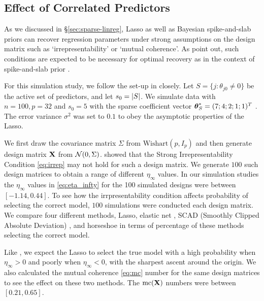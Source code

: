 \documentclass[sts,preprint]{imsart}
\begin{document}
\subsection{Effect of Correlated Predictors}

As we discussed in \S \ref{sec:sparse-linreg}, Lasso as well as Bayesian spike-and-slab priors can recover regression parameters under strong assumptions on the design matrix such as `irrepresentability' or `mutual coherence'. As \citet{van2017adaptive} point out, such conditions are expected to be necessary for optimal recovery as in the context of spike-and-slab prior \citep{castillo2015bayesian}. 

For this simulation study, we follow the set-up in \citet{zhao2006model} closely. Let $S = \{j : \theta_{j0} \ne 0 \}$ be the active set of predictors, and let $s_0 = \lvert S\rvert$. We simulate data with $n = 100, p = 32$ and $s_0 = 5$ with the sparse coefficient vector $\boldsymbol{\theta}_S^* = (7; 4; 2; 1; 1)^T$ . The error variance $\sigma^2$ was set to $0.1$ to obey the asymptotic properties of the Lasso. 


We first draw the covariance matrix $\Sigma$ from $\text{Wishart}(p, I_p)$ and then generate design matrix ${\bf X}$ from ${\cal N}(0, \Sigma)$. \citet{zhao2006model} showed that the Strong Irrepresentability Condition \eqref{eq:irrep} may not hold for such a design matrix. We generate $100$ such design matrices to obtain a range of different $\eta_{\infty}$ values. In our simulation studies the $\eta_{\infty}$ values in \eqref{eq:eta_infty} for the 100 simulated designs were between $[-1.14,0.44]$. To see how the irrpresentability condition affects probability of selecting the correct model, $100$ simulations were conducted each design matrix. We compare four different methods, Lasso, elastic net \citep{zou2006adaptive}, SCAD (Smoothly Clipped Absolute Deviation) \citep{fan2001variable}, and horseshoe in terms of percentage of these methods selecting the correct model. 

Like \cite{zhao2006model}, we expect the Lasso to select the true model with a high probability when $\eta_{\infty} >0$ and poorly when $\eta_{\infty} < 0$, with the sharpest ascent around the origin. We also calculated the mutual coherence \eqref{eq:mc} number for the same design matrices to see the effect on these two methods. The $\text{mc}({\bf X})$ numbers were between $[0.21, 0.65]$. 
\end{document}
